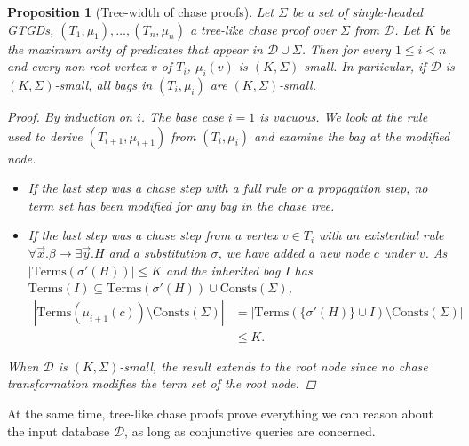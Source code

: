 \documentclass[12pt]{report}
\theoremstyle{plain}
\newtheorem{proposition}[theorem]{Proposition}
\theoremstyle{definition}
\def\Consts{{\mathrm{Consts}}}
\def\Terms{{\mathrm{Terms}}}
\begin{document}
\begin{proposition}[Tree-width of chase proofs]
\label{chase-proofs-tree-width}
  Let $\Sigma$ be a set of \emph{single-headed} GTGDs, $(T_1, \mu_1), \ldots, (T_n, \mu_n)$ a tree-like chase proof over $\Sigma$ from $\mathcal{D}$. Let $K$ be the maximum arity of predicates that appear in $\mathcal{D} \cup \Sigma$. Then for every $1 \leq i < n$ and every non-root vertex $v$ of $T_i$, $\mu_i(v)$ is $(K, \Sigma)$-small. In particular, if $\mathcal{D}$ is $(K, \Sigma)$-small, all bags in $(T_i, \mu_i)$ are $(K, \Sigma)$-small.
  \begin{proof}
    By induction on $i$. The base case $i = 1$ is vacuous. We look at the rule used to derive $(T_{i+1}, \mu_{i+1})$ from $(T_{i}, \mu_{i})$ and examine the bag at the modified node.
    \begin{itemize}
      \item If the last step was a chase step with a full rule or a propagation step, no term set has been modified for any bag in the chase tree.
      \item If the last step was a chase step from a vertex $v \in T_i$ with an existential rule $\forall \vec{x}. \beta \rightarrow \exists \vec{y}. H$ and a substitution $\sigma$, we have added a new node $c$ under $v$. As $|\Terms(\sigma'(H))| \leq K$ and the inherited bag $I$ has $\Terms(I) \subseteq \Terms(\sigma'(H)) \cup \Consts(\Sigma)$,
      \begin{equation*}
        \begin{split}
          |\Terms(\mu_{i+1}(c)) \setminus \Consts(\Sigma)|
            &= |\Terms(\{\sigma'(H)\} \cup I) \setminus \Consts(\Sigma)| \\
            &\leq K.
        \end{split}
      \end{equation*}
    \end{itemize}
    When $\mathcal{D}$ is $(K, \Sigma)$-small, the result extends to the root node since no chase transformation modifies the term set of the root node.
  \end{proof}
\end{proposition}

At the same time, tree-like chase proofs prove everything we can reason about the input database $\mathcal{D}$, as long as conjunctive queries are concerned.
\end{document}
